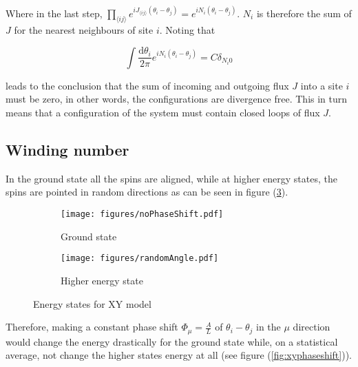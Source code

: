 Where in the last step, $\prod_{\langle ij \rangle} e^{iJ_{\langle ij \rangle} (\theta_i - \theta_j)} = e^{iN_i (\theta_i - \theta_j)}$. $N_i$ is therefore the sum of $J$ for the nearest neighbours of site $i$. Noting that

\begin{equation}
    \int \frac{\mathrm d \theta_i}{2 \pi} e^{i N_i (\theta_i - \theta_j)} = C \delta_{N_i 0}
\end{equation}

leads to the conclusion that the sum of incoming and outgoing flux $J$ into a site $i$ must be zero, in other words, the configurations are divergence free. This in turn means that a configuration of the system must contain closed loops of flux $J$.


\subsection{Winding number}
\label{subsec:XYWindingNum}

In the ground state all the spins are aligned, while at higher energy states, the spins are pointed in random directions as can be seen in figure (\ref{fig:xygroundhigher}).

\begin{figure}[h!]
\centering
    \begin{subfigure}{.4\textwidth}
        \centering
        \texttt{[image: figures/noPhaseShift.pdf]}
        \caption{Ground state}
        \label{fig:xyground}
    \end{subfigure}
    \begin{subfigure}{.4\textwidth}
        \centering
        \texttt{[image: figures/randomAngle.pdf]}
        \caption{Higher energy state}
        \label{fig:xyhigher}
    \end{subfigure}
    \caption{Energy states for XY model}
\label{fig:xygroundhigher}
\end{figure}

Therefore, making a constant phase shift $\Phi_\mu = \frac{A}{L}$ of $\theta_i - \theta_j$ in the $\mu$ direction would change the energy drastically for the ground state while, on a statistical average, not change the higher states energy at all (see figure (\ref{fig:xyphaseshift})).

